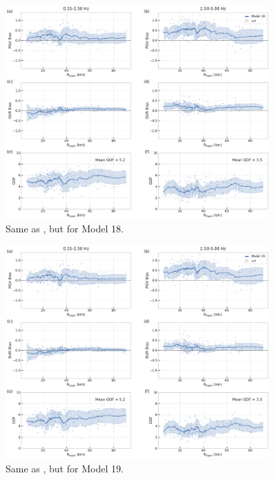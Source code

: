 \begin{figure}[!ht]
  \centering
  \includegraphics[width=0.9\textwidth,height=0.9\textheight,keepaspectratio]{figures/figure_highf_S28.pdf}
  \caption{Same as , but for Model 18.
  }
\label{fig:highf-A28}
\end{figure}
\clearpage


\begin{figure}[!ht]
  \centering
  \includegraphics[width=0.9\textwidth,height=0.9\textheight,keepaspectratio]{figures/figure_highf_S29.pdf}
  \caption{Same as , but for Model 19.
  }
\label{fig:highf-A29}
\end{figure}
\clearpage


